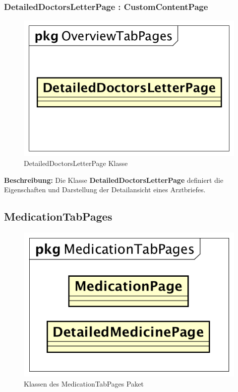 \documentclass[a4paper]{scrreprt}
\begin{document}
\subsubsection{DetailedDoctorsLetterPage : CustomContentPage}
\begin{figure}[H]
\centering
\includegraphics[width=0.45\textheight]{graphics/Klassendiagramme/View/DetailedDoctorsLetterPage.png}
\caption{DetailedDoctorsLetterPage Klasse}
\end{figure}

\textbf{Beschreibung:} Die Klasse \textbf{DetailedDoctorsLetterPage} definiert die Eigenschaften und Darstellung der Detailansicht eines Arztbriefes.

\subsection{MedicationTabPages}
\begin{figure}[H]
\centering
\includegraphics[width=0.55\textheight]{graphics/Klassendiagramme/View/MedicationTabPages.png}
\caption{Klassen des MedicationTabPages Paket}
\end{figure}
\end{document}
